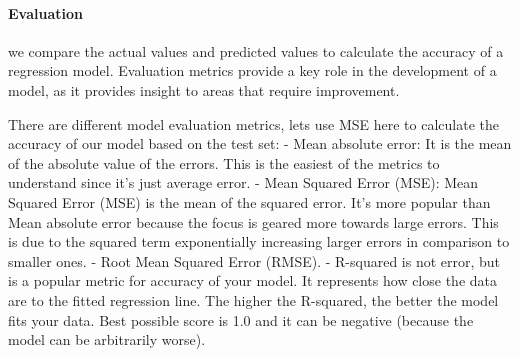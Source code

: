 \documentclass[11pt]{article}
\begin{document}
    \paragraph{Evaluation}\label{evaluation}

we compare the actual values and predicted values to calculate the
accuracy of a regression model. Evaluation metrics provide a key role in
the development of a model, as it provides insight to areas that require
improvement.

There are different model evaluation metrics, lets use MSE here to
calculate the accuracy of our model based on the test set: - Mean
absolute error: It is the mean of the absolute value of the errors. This
is the easiest of the metrics to understand since it's just average
error. - Mean Squared Error (MSE): Mean Squared Error (MSE) is the mean
of the squared error. It's more popular than Mean absolute error because
the focus is geared more towards large errors. This is due to the
squared term exponentially increasing larger errors in comparison to
smaller ones. - Root Mean Squared Error (RMSE). - R-squared is not
error, but is a popular metric for accuracy of your model. It represents
how close the data are to the fitted regression line. The higher the
R-squared, the better the model fits your data. Best possible score is
1.0 and it can be negative (because the model can be arbitrarily worse).
\end{document}
